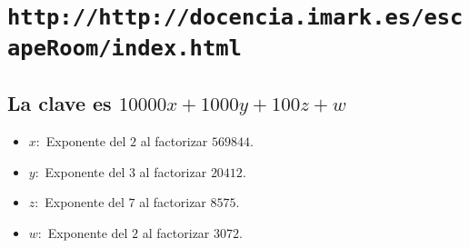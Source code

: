 \documentclass[a4paper,12pt]{article}
\begin{document}
\section*{\texttt{http://http://docencia.imark.es/escapeRoom/index.html}}
\subsection*{La clave es $10000x + 1000y + 100z +w$}
\begin{itemize}
	\item $x:$ Exponente del $2$ al factorizar $569844$.
	\item $y:$ Exponente del $3$ al factorizar $20412$.
	\item $z:$ Exponente del $7$ al factorizar $8575$.
	\item $w:$ Exponente del $2$ al factorizar $3072$.
\end{itemize}
\end{document}
